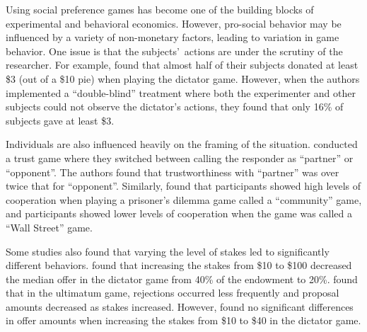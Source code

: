 \documentclass[12pt]{article}
\begin{document}

Using social preference games has become one of the building blocks of experimental and behavioral economics. However, pro-social behavior may be influenced by a variety of non-monetary factors, leading to variation in game behavior. One issue is that the subjects\rq \ actions are under the scrutiny of the researcher. For example, \cite{hoffman_1994} found that almost half of their subjects donated at least \$3 (out of a \$10 pie) when playing the dictator game. However, when the authors implemented a ``double-blind'' treatment where both the experimenter and other subjects could not observe the dictator\rq s actions, they found that only 16\% of subjects gave at least \$3.

Individuals are also influenced heavily on the framing of the situation. \cite{burnham_mccabe_smith_2000} conducted a trust game where they switched between calling the responder as ``partner'' or ``opponent''. The authors found that trustworthiness with ``partner'' was over twice that for ``opponent''. Similarly, \cite{ross_ward_1996} found that participants showed high levels of cooperation when playing a prisoner\rq s dilemma game called a ``community'' game, and participants showed lower levels of cooperation when the game was called a ``Wall Street'' game. 

Some studies also found that varying the level of stakes led to significantly different behaviors. \cite{carpenter_verhoogen_burks_2005} found that increasing the stakes from \$10 to \$100 decreased the median offer in the dictator game from 40\% of the endowment to 20\%. \cite{slonim_roth_1998} found that in the ultimatum game, rejections occurred less frequently and proposal amounts decreased as stakes increased. However, \cite{cherry_frykblom_shogren_2002} found no significant differences in offer amounts when increasing the stakes from \$10 to \$40 in the dictator game. 
\end{document}
